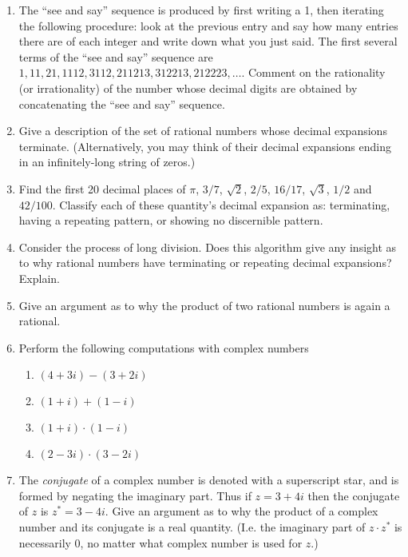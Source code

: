 \begin{enumerate}
\item The ``see and say'' sequence is produced by first writing a 1, 
then iterating the following procedure:  look at the previous entry 
and say how many entries there are of each integer and write down what 
you just said.  The first several terms of the ``see and say'' sequence 
are $1, 11, 21, 1112, 3112, 211213, 312213, 212223, \ldots$.  Comment on the
rationality (or irrationality) of the number whose decimal digits are obtained 
by concatenating the ``see and say'' sequence.

\vfill

\item Give a description of the set of rational numbers whose decimal
expansions terminate.  (Alternatively, you may think of their decimal
expansions ending in an infinitely-long string of zeros.)

\vfill

\item Find the first 20 decimal places of $\pi$, $3/7$, $\sqrt{2}$, 
  $2/5$, $16/17$, $\sqrt{3}$, $1/2$ and $42/100$.  Classify each of
these quantity's decimal expansion as: terminating, having a repeating
pattern, or showing no discernible pattern.

\vfill

\workbookpagebreak
 
\item Consider the process of long division.  Does this algorithm give
any insight as to why rational numbers have terminating or repeating
decimal expansions?  Explain.

\vfill

\item Give an argument as to why the product of two rational numbers
is again a rational.

\vfill

\item Perform the following computations with complex numbers

  \begin{enumerate}
  \item \rule{0pt}{20pt}$ (4 + 3i) - (3 + 2i) $
  \item \rule{0pt}{20pt}$ (1 + i) + (1 - i) $
  \item \rule{0pt}{20pt}$ (1 + i) \cdot (1 - i) $
  \item \rule{0pt}{20pt}$ (2 - 3i) \cdot (3 - 2i) $
  \end{enumerate}

\vfill

\textbookpagebreak

\item The {\em conjugate} of a complex number is denoted with a
  superscript star, and is formed by negating the imaginary part.
  Thus if $z = 3+ 4i$ then the conjugate of $z$ is  $z^\ast = 3-4i$.
  Give an argument as to why the product of a complex number and its
  conjugate is a real quantity.  (I.e. the imaginary part of
  $z\cdot z^\ast$ is necessarily 0, no matter what complex number is
  used for $z$.) 

\workbookpagebreak

\end{enumerate}




